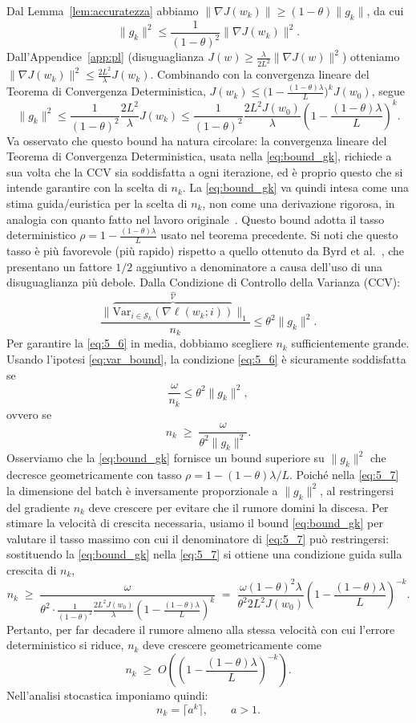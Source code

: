 \documentclass[a4paper,12pt]{article}
\numberwithin{equation}{section}
\numberwithin{figure}{section}
\numberwithin{table}{section}
\begin{document}
Dal Lemma~\ref{lem:accuratezza} abbiamo $\|\nabla J(w_k)\|\ge(1-\theta)\|g_k\|$,
da cui
\[
\|g_k\|^2\le\frac{1}{(1-\theta)^2}\|\nabla J(w_k)\|^2.
\]
Dall'Appendice~\ref{app:pl} (disuguaglianza $J(w)\ge\frac{\lambda}{2L^2}\|\nabla J(w)\|^2$)
otteniamo $\|\nabla J(w_k)\|^2\le\frac{2L^2}{\lambda}J(w_k)$.
Combinando con la convergenza lineare del Teorema di Convergenza Deterministica,
$J(w_k)\le\bigl(1-\frac{(1-\theta)\lambda}{L}\bigr)^k J(w_0)$, segue
\[
\|g_k\|^2\le\frac{1}{(1-\theta)^2}\frac{2L^2}{\lambda}J(w_k)
\le\frac{1}{(1-\theta)^2}\frac{2L^2 J(w_0)}{\lambda}
\left(1-\frac{(1-\theta)\lambda}{L}\right)^k.
\tag{5.5}\label{eq:bound_gk}
\]
Va osservato che questo bound ha natura circolare: la convergenza lineare del Teorema di Convergenza Deterministica, usata nella \eqref{eq:bound_gk}, richiede a sua volta che la CCV sia soddisfatta a ogni iterazione, ed è proprio questo che si intende garantire con la scelta di $n_k$. La \eqref{eq:bound_gk} va quindi intesa come una stima guida/euristica per la scelta di $n_k$, non come una derivazione rigorosa, in analogia con quanto fatto nel lavoro originale~\cite{byrd2012}.
Questo bound adotta il tasso deterministico $\rho=1-\frac{(1-\theta)\lambda}{L}$ usato nel teorema precedente.  Si noti che questo tasso è più favorevole (più rapido) rispetto a quello ottenuto da Byrd et al.~\cite{byrd2012}, che presentano un fattore $1/2$ aggiuntivo a denominatore a causa dell'uso di una disuguaglianza più debole.
Dalla Condizione di Controllo della Varianza (CCV):
\[
\frac{\|\overbrace{\mathrm{Var}_{i\in\mathcal{S}_k}(\nabla \ell(w_k;i))}^{\widehat{\mathcal{V}}}\|_1}{n_k} \le \theta^2 \|g_k\|^2. \tag{5.6}\label{eq:5_6}\]
Per garantire la \eqref{eq:5_6} in media, dobbiamo scegliere \(n_k\) sufficientemente grande. Usando l'ipotesi \eqref{eq:var_bound}, la condizione \eqref{eq:5_6} è sicuramente soddisfatta se
\[
\frac{\omega}{n_k} \le \theta^2 \|g_k\|^2,
\]
ovvero se
\[
n_k \;\ge\; \frac{\omega}{\theta^2 \|g_k\|^2}. \tag{5.7}\label{eq:5_7}
\]
Osserviamo che la \eqref{eq:bound_gk} fornisce un bound superiore su \(\|g_k\|^2\) che decresce geometricamente con tasso \(\rho = 1-(1-\theta)\lambda/L\). Poiché nella \eqref{eq:5_7} la dimensione del batch è inversamente proporzionale a \(\|g_k\|^2\), al restringersi del gradiente \(n_k\) deve crescere per evitare che il rumore domini la discesa. Per stimare la velocità di crescita necessaria, usiamo il bound \eqref{eq:bound_gk} per valutare il tasso massimo con cui il denominatore di \eqref{eq:5_7} può restringersi: sostituendo la \eqref{eq:bound_gk} nella \eqref{eq:5_7} si ottiene una condizione guida sulla crescita di \(n_k\),
\[
n_k \;\ge\; \frac{\omega}{\theta^2 \cdot \frac{1}{(1-\theta)^2}\frac{2L^2 J(w_0)}{\lambda}\left(1 - \frac{(1-\theta)\lambda}{L}\right)^k}
\;=\; \frac{\omega (1-\theta)^2 \lambda}{\theta^2 2L^2 J(w_0)}
\left(1 - \frac{(1-\theta)\lambda}{L}\right)^{-k}. \tag{5.8}\label{eq:5_8}
\]
Pertanto, per far decadere il rumore almeno alla stessa velocità con cui l'errore deterministico si riduce, \(n_k\) deve crescere geometricamente come
\[
n_k \;\ge\; O\!\left(\left(1 - \frac{(1-\theta)\lambda}{L}\right)^{-k}\right).
\]
Nell'analisi stocastica imponiamo quindi:
\[
n_k = \lceil a^k \rceil, \qquad a > 1. \tag{5.9}\label{eq:5_9}
\]
\end{document}
